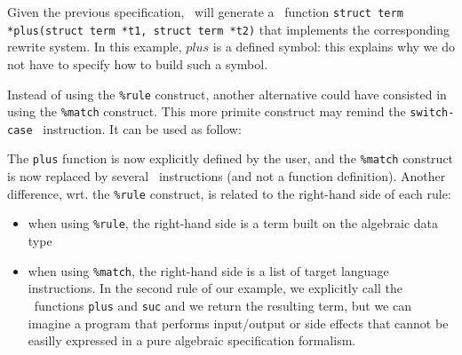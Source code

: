 
Given the previous specification, \TOM\ will generate a \C\ function
\texttt{struct term *plus(struct term *t1, struct term *t2)} that
implements the corresponding rewrite system. In this example, $plus$ is
a defined symbol: this explains why we do not have to specify how to
build such a symbol.

Instead of using the \texttt{\%rule} construct, another alternative
could have consisted in using the \texttt{\%match} construct. 
This more primite construct may remind the \texttt{switch-case}
\C~instruction. It can be used as follow:


The \texttt{plus} function is now explicitly defined by the user, and
the \texttt{\%match} construct is now replaced by several \C\
instructions (and not a function definition). Another difference,
wrt. the \texttt{\%rule} construct, is related to the right-hand side
of each rule: 
\begin{itemize}
\item when using \texttt{\%rule}, the right-hand side is a
  term built on the algebraic data type
\item when using \texttt{\%match}, the right-hand side is a list of
  target language instructions. In the second rule of our example, we
  explicitly call the \C\ functions \texttt{plus} and \texttt{suc} and
  we return the resulting term, but we can imagine a program that
  performs input/output or side effects that cannot be easilly
  expressed in a pure algebraic specification formalism. 
\end{itemize}
